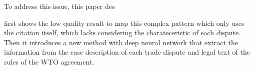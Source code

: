 To address this issue, 
this paper des


first shows the low quality result to map this complex pattern which only uses the citation itself, which lacks considering the charateceristic of each dispute.
Then it introduces a new method with deep neural network that extract the information from the case description of each trade dispute and legal text of the rules of the WTO agreement.

